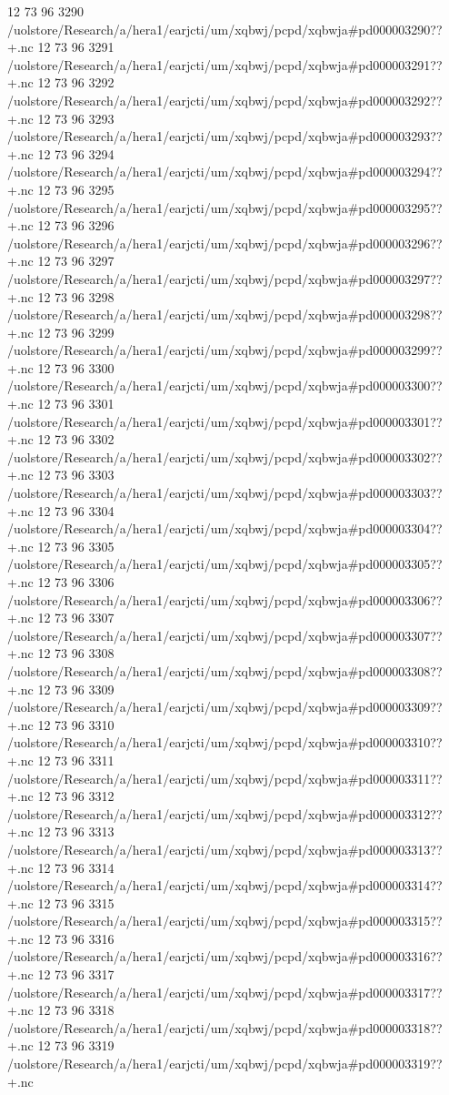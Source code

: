 12 73 96
3290
/uolstore/Research/a/hera1/earjcti/um/xqbwj/pcpd/xqbwja#pd000003290??+.nc
12 73 96
3291
/uolstore/Research/a/hera1/earjcti/um/xqbwj/pcpd/xqbwja#pd000003291??+.nc
12 73 96
3292
/uolstore/Research/a/hera1/earjcti/um/xqbwj/pcpd/xqbwja#pd000003292??+.nc
12 73 96
3293
/uolstore/Research/a/hera1/earjcti/um/xqbwj/pcpd/xqbwja#pd000003293??+.nc
12 73 96
3294
/uolstore/Research/a/hera1/earjcti/um/xqbwj/pcpd/xqbwja#pd000003294??+.nc
12 73 96
3295
/uolstore/Research/a/hera1/earjcti/um/xqbwj/pcpd/xqbwja#pd000003295??+.nc
12 73 96
3296
/uolstore/Research/a/hera1/earjcti/um/xqbwj/pcpd/xqbwja#pd000003296??+.nc
12 73 96
3297
/uolstore/Research/a/hera1/earjcti/um/xqbwj/pcpd/xqbwja#pd000003297??+.nc
12 73 96
3298
/uolstore/Research/a/hera1/earjcti/um/xqbwj/pcpd/xqbwja#pd000003298??+.nc
12 73 96
3299
/uolstore/Research/a/hera1/earjcti/um/xqbwj/pcpd/xqbwja#pd000003299??+.nc
12 73 96
3300
/uolstore/Research/a/hera1/earjcti/um/xqbwj/pcpd/xqbwja#pd000003300??+.nc
12 73 96
3301
/uolstore/Research/a/hera1/earjcti/um/xqbwj/pcpd/xqbwja#pd000003301??+.nc
12 73 96
3302
/uolstore/Research/a/hera1/earjcti/um/xqbwj/pcpd/xqbwja#pd000003302??+.nc
12 73 96
3303
/uolstore/Research/a/hera1/earjcti/um/xqbwj/pcpd/xqbwja#pd000003303??+.nc
12 73 96
3304
/uolstore/Research/a/hera1/earjcti/um/xqbwj/pcpd/xqbwja#pd000003304??+.nc
12 73 96
3305
/uolstore/Research/a/hera1/earjcti/um/xqbwj/pcpd/xqbwja#pd000003305??+.nc
12 73 96
3306
/uolstore/Research/a/hera1/earjcti/um/xqbwj/pcpd/xqbwja#pd000003306??+.nc
12 73 96
3307
/uolstore/Research/a/hera1/earjcti/um/xqbwj/pcpd/xqbwja#pd000003307??+.nc
12 73 96
3308
/uolstore/Research/a/hera1/earjcti/um/xqbwj/pcpd/xqbwja#pd000003308??+.nc
12 73 96
3309
/uolstore/Research/a/hera1/earjcti/um/xqbwj/pcpd/xqbwja#pd000003309??+.nc
12 73 96
3310
/uolstore/Research/a/hera1/earjcti/um/xqbwj/pcpd/xqbwja#pd000003310??+.nc
12 73 96
3311
/uolstore/Research/a/hera1/earjcti/um/xqbwj/pcpd/xqbwja#pd000003311??+.nc
12 73 96
3312
/uolstore/Research/a/hera1/earjcti/um/xqbwj/pcpd/xqbwja#pd000003312??+.nc
12 73 96
3313
/uolstore/Research/a/hera1/earjcti/um/xqbwj/pcpd/xqbwja#pd000003313??+.nc
12 73 96
3314
/uolstore/Research/a/hera1/earjcti/um/xqbwj/pcpd/xqbwja#pd000003314??+.nc
12 73 96
3315
/uolstore/Research/a/hera1/earjcti/um/xqbwj/pcpd/xqbwja#pd000003315??+.nc
12 73 96
3316
/uolstore/Research/a/hera1/earjcti/um/xqbwj/pcpd/xqbwja#pd000003316??+.nc
12 73 96
3317
/uolstore/Research/a/hera1/earjcti/um/xqbwj/pcpd/xqbwja#pd000003317??+.nc
12 73 96
3318
/uolstore/Research/a/hera1/earjcti/um/xqbwj/pcpd/xqbwja#pd000003318??+.nc
12 73 96
3319
/uolstore/Research/a/hera1/earjcti/um/xqbwj/pcpd/xqbwja#pd000003319??+.nc
